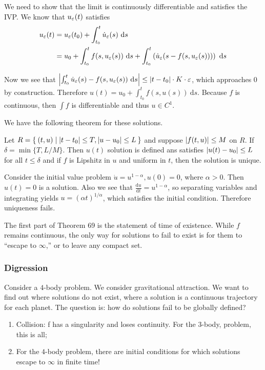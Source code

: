 \documentclass[10pt, twoside]{article}
\renewcommand{\d}{\ \mathrm{d}}
\begin{document}
\begin{exm}
        We need to show that the limit is continuously differentiable and
        satisfies the IVP. We know that $u_{\varepsilon}(t)$ satisfies \begin{align*}
            u_{\ep}(t) &= u_{\ep}(t_0) + \int_{t_0}^t \dot{u}_{\ep}(s) \d s \\
                       &= u_0 + \int_{t_0}^t f(s, u_{\ep}(s)) \d s +
                       \int_{t_0}^t \left(\dot{u}_{\ep}(s -
                       f(s,u_{\ep}(s)))\right) \d s \end{align*}

        Now we see that $\abs*{\int_{t_0}^t \dot{u}_{\ep}(s) - f(s,u_{\ep}(s))
    \d s} \leq \abs{t-t_0}\cdot K \cdot \ep$, which approaches $0$ by
construction. Therefore $u(t) = u_0 + \int_{t_0}^t f(s,u(s)) \d s$. Because $f$
is continuous, then $\int f$ is differentiable and thus $u \in C^1$.  \end{exm}
    
    We have the following theorem for these solutions.  \begin{thm} Let $R =
        \Set{(t,u) | \lvert t-t_0\rvert \leq T, \lvert u-u_0\rvert \leq L}$ and suppose
        $\lvert f(t,u)\rvert \leq M$ on $R$. If $\delta = \min\{T,L/M\}$. Then $u(t)$
        solution is defined ans satisfies $\lvert u(t) - u_0\rvert \leq L$ for all $t
        \leq \delta$ and if $f$ is Lipshitz in $u$ and uniform in $t$, then the
        solution is unique.  \end{thm}

    \begin{exm} Consider the initial value problem $\dot{u} = u^{1- \alpha},
        u(0) = 0$, where $\alpha > 0$. Then $u(t) = 0$ is a solution. Also we
        see that $\frac{\mathrm{d} u}{\mathrm{d} t} = u^{1-\alpha}$, so
        separating variables and integrating yields $u = (\alpha
        t)^{1/\alpha}$, which satisfies the initial condition. Therefore
        uniqueness fails.  \end{exm}

    The first part of Theorem 69 is the statement of time of existence. While
    $f$ remains continuous, the only way for solutions to fail to exist is for
    them to ``escape to $\infty$,'' or to leave any compact set.

    \subsubsection{Digression} Consider a $4$-body problem. We consider
    gravitational attraction. We want to find out where solutions do not exist,
    where a solution is a continuous trajectory for each planet. The question
    is: how do solutions fail to be globally defined?  \begin{enumerate} \item
        Collision: f has a singularity and loses continuity. For the $3$-body,
        problem, this is all; \item For the $4$-body problem, there are initial
        conditions for which solutions escape to $\infty$ in finite time!
\end{enumerate}
\end{document}
